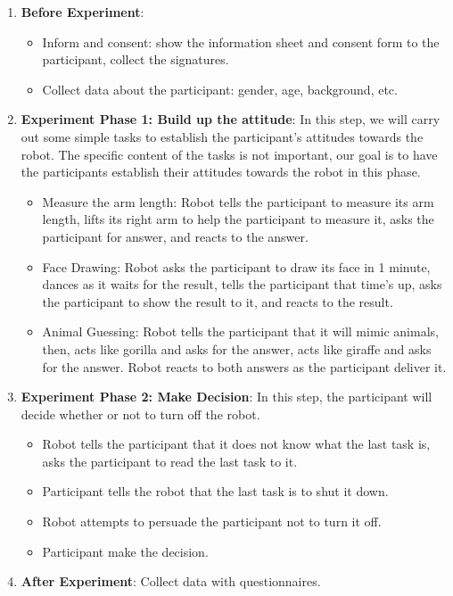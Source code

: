 \documentclass[conference]{IEEEtran}
\begin{document}
\begin{enumerate}
    \item \textbf{Before Experiment}:
    \begin{itemize}
        \item Inform and consent: show the information sheet and consent form to the participant, collect the signatures.
        \item Collect data about the participant: gender, age, background, etc.
    \end{itemize}
    \item \textbf{Experiment Phase 1: Build up the attitude}: In this step, we will carry out some simple tasks to establish the participant's attitudes towards the robot. The specific content of the tasks is not important, our goal is to have the participants establish their attitudes towards the robot in this phase.
    \begin{itemize}
        \item Measure the arm length: Robot tells the participant to measure its arm length, lifts its right arm to help the participant to measure it, asks the participant for answer, and reacts to the answer.
        \item Face Drawing: Robot asks the participant to draw its face in 1 minute, dances as it waits for the result, tells the participant that time's up, asks the participant to show the result to it, and reacts to the result.
        \item Animal Guessing: Robot tells the participant that it will mimic animals, then, acts like gorilla and asks for the answer, acts like giraffe and asks for the answer. Robot reacts to both answers as the participant deliver it.
    \end{itemize}
    
    \item \textbf{Experiment Phase 2: Make Decision}: In this step, the participant will decide whether or not to turn off the robot.
    \begin{itemize}
        \item Robot tells the participant that it does not know what the last task is, asks the participant to read the last task to it.
        \item Participant tells the robot that the last task is to shut it down.
        \item Robot attempts to persuade the participant not to turn it off.
        \item Participant make the decision.
    \end{itemize}
    \item \textbf{After Experiment}: Collect data with questionnaires.
\end{enumerate}
\end{document}
